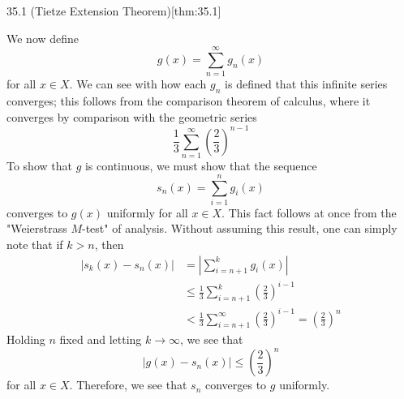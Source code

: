 \begin{thmBox}{35.1 (Tietze Extension Theorem)}[thm:35.1]
\begin{proofBox}
    We now define 
    \begin{equation*}
        g ( x )
        =
        \sum_{ n = 1 }^{ \infty } g_{ n } ( x )
    \end{equation*}
    for all \( x \in X \). 
    We can see with how each \( g_{ n } \) is defined that this infinite series 
    converges; this follows from the comparison theorem of calculus, where 
    it converges by comparison with the geometric series 
    \begin{equation*}
        \frac{ 1 }{ 3 } 
        \sum_{ n = 1 }^{ \infty } \left( \frac{ 2 }{ 3 } \right)^{ n - 1 }
    \end{equation*}
    To show that \( g \) is continuous, we must show that the sequence 
    \begin{equation*}
        s_{ n } ( x ) = \sum_{ i = 1 }^{ n } g_{ i } ( x )
    \end{equation*}
    converges to \( g ( x ) \) uniformly for all \( x \in X \).
    This fact follows at once from the "Weierstrass \( M \)-test" of analysis. 
    Without assuming this result, one can simply note that if \( k > n \), then
    \begin{equation*}
        \begin{aligned}
            \lvert s_{ k } ( x ) - s_{ n } ( x ) \rvert
            &=
            \left\lvert
                \sum_{ i = n + 1 }^{ k } g_{ i } ( x )
            \right\rvert
            \\
            &\leq 
            \frac{ 1 }{ 3 } \sum_{ i = n + 1 }^{ k } 
            \left( \frac{ 2 }{ 3 } \right)^{ i - 1 }
            \\
            &< 
            \frac{ 1 }{ 3 } \sum_{ i = n + 1 }^{ \infty } 
            \left( \frac{ 2 }{ 3 } \right)^{ i - 1 }
            =
            \left( \frac{ 2 }{ 3 } \right)^{ n }
        \end{aligned}
    \end{equation*} 
    Holding \( n \) fixed and letting \( k \rightarrow \infty \), we see that 
    \begin{equation*}
        \lvert g ( x ) - s_{ n } ( x ) \rvert \leq 
        \left( \frac{ 2 }{ 3 } \right)^{ n }
    \end{equation*}
    for all \( x \in X \). 
    Therefore, we see that \( s_{ n } \) converges to \( g \) uniformly. 

    \baseSkip 


\end{proofBox}
\end{thmBox}

